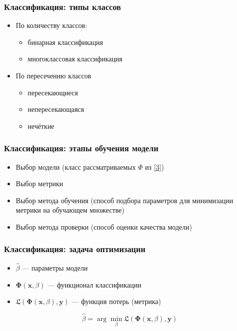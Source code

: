 \documentclass[11pt]{beamer}
\begin{document}
	\begin{frame}
		\frametitle{Классификация: типы классов}
		\begin{itemize}
			\item По количеству классов:
			\begin{itemize}
				\item бинарная классификация
				\item многоклассовая классификация
			\end{itemize}
			\item По пересечению классов 
			\begin{itemize}
				\item пересекающиеся
				\item непересекающаяся
				\item нечёткие
			\end{itemize}
		\end{itemize}
	\end{frame}
	\begin{frame}
		\frametitle{Классификация: этапы обучения модели}
		\begin{itemize}
			\item Выбор модели (класс рассматриваемых $\Phi$ из \ref{3})
			\item Выбор метрики
			\item Выбор метода обучения (способ подбора параметров для минимизации метрики на обучающем множестве)
			\item Выбор метода проверки (способ оценки качества модели)
		\end{itemize}
	\end{frame}
	\begin{frame}
		\frametitle{Классификация: задача оптимизации}
		\begin{itemize}
			\item $\hat{\beta}$ --- параметры модели
			\item $\bm{\Phi}(\bm{x}, \beta)$ --- функционал классификации
			\item $\mathfrak{L}(\bm{\Phi}(\bm{x}, \beta), \bm{y})$ --- функция потерь (метрика)
		\end{itemize}
		\begin{block}{}
			$$\hat{\beta} = \arg\min_{\beta} \mathfrak{L}(\bm{\Phi}(\bm{x}, \beta), \bm{y})$$
		\end{block}

	\end{frame}
\end{document}
